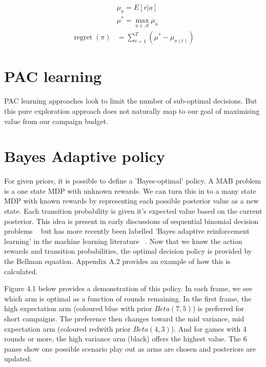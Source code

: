 \documentclass[11pt,a4,singlespacing,titlepagenumber=on]{scrreprt}
\numberwithin{equation}{chapter} %
\theoremstyle{remark}
\begin{document}
\begin{align}
&\mu_a = E[r|a] \\
&\mu^{*} = \max_{a \in \mathcal{A}} \mu_a \\
\operatorname{regret}(\pi) &= \sum_{t=1}^T (\mu^{*} - \mu_{\pi(t)})
\end{align}

\section{PAC learning}

PAC learning approaches look to limit the number of sub-optimal decisions. But this pure exploration approach does not naturally map to our goal of maximising value from our campaign budget.

\section{ Bayes Adaptive policy }

For given priors, it is possible to define a 'Bayes-optimal' policy. A MAB problem is a one state MDP with unknown rewards. We can turn this in to a many state MDP with known rewards by representing each possible posterior value as a new state. Each transition probability is given it's expected value based on the current posterior. This idea is present in early discussions of sequential binomial decision problems ~\cite{chernoff1965bayes} but has more recently been labelled 'Bayes adaptive reinforcement learning' in the machine learning literature ~\cite{duff2002optimal}. Now that we know the action rewards and transition probabilities, the optimal decision policy is provided by the Bellman equation. Appendix A.2 provides an example of how this is calculated.

Figure 4.1 below provides a demonstration of this policy. In each frame, we see which arm is optimal as a function of rounds remaining. In the first frame, the high expectation arm (coloured blue with prior $Beta(7,5)$) is preferred for short campaigns. The preference then changes toward the mid variance, mid expectation arm (coloured redwith prior $Beta(4,3)$). And for games with 4 rounds or more, the high variance arm (black) offers the highest value. The 6 panes show one possible scenario play out as arms are chosen and posteriors are updated.
\end{document}

